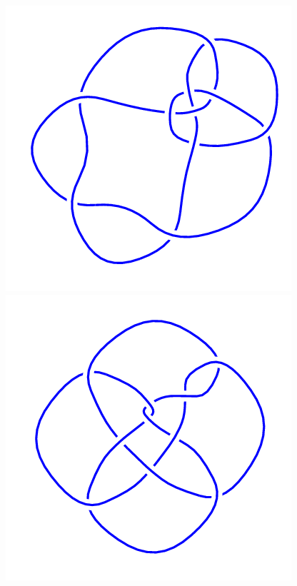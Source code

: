 \begin{figure}[H]
\begin{minipage}[b]{.18\linewidth}
    \end{minipage}
    \begin{minipage}[b]{.18\linewidth}
        \centering
        \includegraphics[width=\linewidth]{../data/10_114.png}
    \end{minipage}
    \begin{minipage}[b]{.18\linewidth}
        \centering
        \includegraphics[width=\linewidth]{../data/10_115.png}

\end{minipage}
\end{figure}
